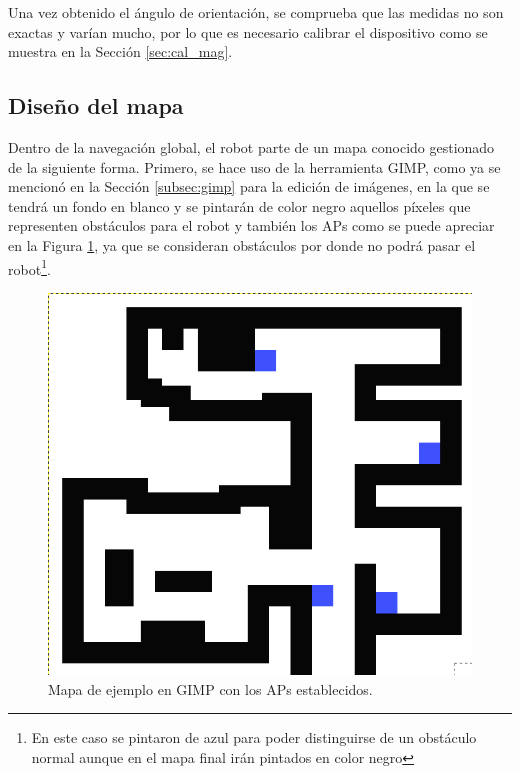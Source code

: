 Una vez obtenido el ángulo de orientación, se comprueba que las medidas no son exactas y varían mucho, por lo que es necesario calibrar el dispositivo como se muestra en la Sección \ref{sec:cal_mag}.



\subsection{Diseño del mapa}
\label{subsec:diseño_mapa}

Dentro de la navegación global, el robot parte de un mapa conocido gestionado de la siguiente forma. Primero, se hace uso de la herramienta GIMP, como ya se mencionó en la Sección \ref{subsec:gimp} para la edición de imágenes, en la que se tendrá un fondo en blanco y se pintarán de color negro aquellos píxeles que representen obstáculos para el robot y también los APs como se puede apreciar en la Figura \ref{fig:mapa_apes}, ya que se consideran obstáculos por donde no podrá pasar el robot\footnote{En este caso se pintaron de azul para poder distinguirse de un obstáculo normal aunque en el mapa final irán pintados en color negro}.

\begin{figure}[H]
  \centering
  \includegraphics[scale=0.3]{figs/mapa_apes} %
  \caption{ Mapa de ejemplo en GIMP con los APs establecidos.}
  \label{fig:mapa_apes}
\end{figure}

